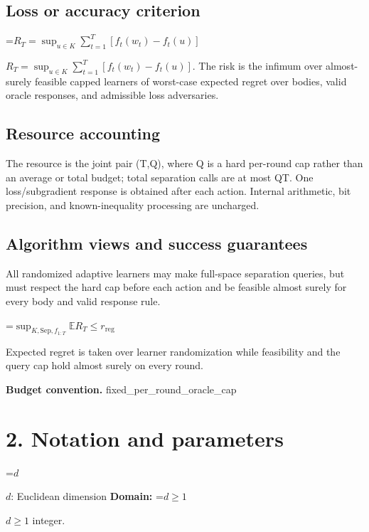 \documentclass[10pt,a4paper]{article}
\newcommand{\AtlasMath}[1]{\par\begingroup\centering\setbox0=\hbox{$\displaystyle #1$}\ifdim\wd0>1.4\linewidth\typeout{ATLAS WIDE FORMULA: \the\wd0}\fi\ifdim\wd0>\linewidth\resizebox{\linewidth}{!}{\box0}\else\box0\fi\par\endgroup}
\newcommand{\AtlasInlineMath}[1]{\begingroup\setbox0=\hbox{$#1$}\ifdim\wd0>.4\linewidth\endgroup\AtlasMath{#1}\else\endgroup$#1$\fi}
\begin{document}
\subsection{Loss or accuracy criterion}


\AtlasInlineMath{R_T=\sup_{u\in K}\sum_{t=1}^T[f_t(w_t)-f_t(u)]}. The risk is the infimum over almost-surely feasible capped learners of worst-case expected regret over bodies, valid oracle responses, and admissible loss adversaries.



\subsection{Resource accounting}


The resource is the joint pair (T,Q), where Q is a hard per-round cap rather than an average or total budget; total separation calls are at most QT. One loss/subgradient response is obtained after each action. Internal arithmetic, bit precision, and known-inequality processing are uncharged.



\subsection{Algorithm views and success guarantees}


All randomized adaptive learners may make full-space separation queries, but must respect the hard cap before each action and be feasible almost surely for every body and valid response rule.




\AtlasMath{\sup_{K,\mathrm{Sep},f_{1:T}}\mathbb E R_T\le r_{\mathrm{reg}}}




Expected regret is taken over learner randomization while feasibility and the query cap hold almost surely on every round.



\textbf{Budget convention.} fixed\_per\_round\_oracle\_cap



\section{2. Notation and parameters}


\AtlasInlineMath{d}: Euclidean dimension \textbf{Domain:} \AtlasInlineMath{d\ge1} integer.
\end{document}
